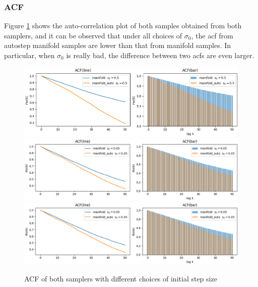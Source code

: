 \documentclass{article}
\begin{document}
\subsubsection{ACF}
Figure \ref{fig:acf} shows the auto-correlation plot of both samples obtained from both samplers, and it can be observed that under all choices of $\sigma_0$, the acf from autostep manifold samples are lower than that from manifold samples. In particular, when $\sigma_0$ is really bad, the difference between two acfs are even larger.
\begin{figure}[H]
    \centering
    \begin{adjustbox}{width=\textwidth}
      \includegraphics{acf_bad_s.png}
      \hspace{1em}
      \includegraphics{acf_good_s.png}
      \hspace{1em}
      \includegraphics{acf_good_s.png}
    \end{adjustbox}
    \caption{ACF of both samplers with different choices of initial step size}
    \label{fig:acf}
\end{figure}
\end{document}
